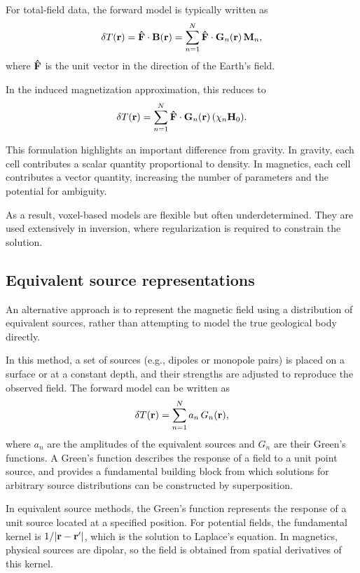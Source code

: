 For total-field data, the forward model is typically written as
\begin{equation}
    \delta T(\vb{r}) = \vu{F} \cdot \vb{B}(\vb{r})
    = \sum_{n=1}^{N} \vu{F} \cdot \mathbf{G}_n(\vb{r}) \, \vb{M}_n,
\end{equation}
where $\vu{F}$ is the unit vector in the direction of the Earth's field.

In the induced magnetization approximation, this reduces to
\begin{equation}
    \delta T(\vb{r}) = \sum_{n=1}^{N} \vu{F} \cdot \mathbf{G}_n(\vb{r}) \, (\chi_n \vb{H}_0).
\end{equation}

This formulation highlights an important difference from gravity. In gravity, each cell contributes a scalar quantity proportional to density. In magnetics, each cell contributes a vector quantity, increasing the number of parameters and the potential for ambiguity.

As a result, voxel-based models are flexible but often underdetermined. They are used extensively in inversion, where regularization is required to constrain the solution.

\subsection{Equivalent source representations}

An alternative approach is to represent the magnetic field using a distribution of equivalent sources, rather than attempting to model the true geological body directly.

In this method, a set of sources (e.g., dipoles or monopole pairs) is placed on a surface or at a constant depth, and their strengths are adjusted to reproduce the observed field. The forward model can be written as
\begin{equation}
    \delta T(\vb{r}) = \sum_{n=1}^{N} a_n \, G_n(\vb{r}),
\end{equation}
where $a_n$ are the amplitudes of the equivalent sources and $G_n$ are their Green's functions.  A Green's function describes the response of a field to a unit point source, and provides a fundamental building block from which solutions for arbitrary source distributions can be constructed by superposition.

In equivalent source methods, the Green's function represents the response of a unit source located at a specified position. For potential fields, the fundamental kernel is $1/|\vb{r} - \vb{r}'|$, which is the solution to Laplace's equation. In magnetics, physical sources are dipolar, so the field is obtained from spatial derivatives of this kernel. 

